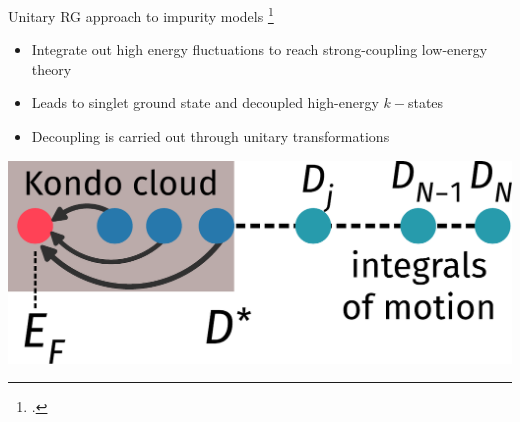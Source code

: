\documentclass[10pt,aspectratio=169]{beamer}
\begin{document}
\begin{frame}{Unitary RG approach to impurity models}
\footcite{anirbanurg1,anirbanurg2}
\begin{minipage}{0.5\textwidth}
\begin{itemize}
	\item Integrate out \alert{high energy fluctuations} to reach strong-coupling low-energy theory\\[10pt]
	\item Leads to \alert{singlet ground state} and decoupled high-energy \(k-\)states\\[10pt]
	\item Decoupling is carried out through \alert{unitary transformations}
\end{itemize}

\end{minipage}
\hspace*{\fill}
\begin{minipage}{0.4\textwidth}
\includegraphics[width=\textwidth]{kondo_fp_1D.pdf}
\end{minipage}
	
\end{frame}
\end{document}
